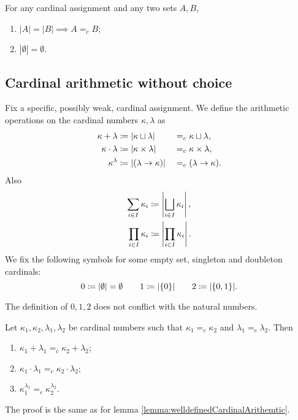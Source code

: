 \begin{lemma}
For any cardinal assignment and any two sets $A,B$,
\begin{enumerate}
\item $|A| = |B| \implies A=_c B$;
\item $|\emptyset| = \emptyset$.
\end{enumerate}
\end{lemma}

\subsection{Cardinal arithmetic without choice}
\begin{definition}
Fix a specific, possibly weak, cardinal assignment. We define the arithmetic operations on the cardinal numbers $\kappa, \lambda$ as
\begin{align*}
\kappa + \lambda &\coloneqq |\kappa \sqcup \lambda | & &=_c \kappa \sqcup \lambda, \\
\kappa \cdot \lambda &\coloneqq |\kappa \times \lambda | & &=_c \kappa \times \lambda, \\
\kappa^\lambda &\coloneqq |(\lambda \to \kappa) | & &=_c (\lambda \to \kappa).
\end{align*}
Also
\begin{align*}
\sum_{i\in I}\kappa_i &\coloneqq \left|\bigsqcup_{i\in I}\kappa_i\right|, \\
\prod_{i\in I}\kappa_i &\coloneqq \left| \prod_{i\in I}\kappa_i \right|.
\end{align*}
We fix the following symbols for some empty set, singleton and doubleton cardinals:
\[ 0 \coloneqq |\emptyset|=\emptyset \qquad 1 \coloneqq |\{0\}| \qquad 2\coloneqq |\{0,1\}|.   \]
\end{definition}
The definition of $0,1,2$ does not conflict with the natural numbers.

\begin{lemma}
Let $\kappa_1,\kappa_2,\lambda_1,\lambda_2$ be cardinal numbers such that $\kappa_1=_c \kappa_2$ and $\lambda_1=_c\lambda_2$. Then
\begin{enumerate}
\item $\kappa_1 + \lambda_1 =_c \kappa_2 + \lambda_2$;
\item $\kappa_1 \cdot \lambda_1 =_c \kappa_2\cdot \lambda_2$;
\item $\kappa_1^{\lambda_1} =_c \kappa_2^{\lambda_2}$.
\end{enumerate}
\end{lemma}
The proof is the same as for lemma \ref{lemma:welldefinedCardinalArithemtic}.

